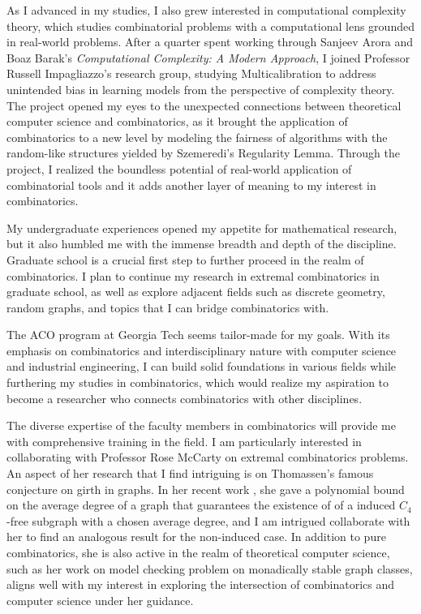\documentclass[12pt]{article}
\begin{document}
As I advanced in my studies, I also grew interested in computational complexity theory, which
studies combinatorial problems with a computational lens grounded in real-world problems. After a
quarter spent working through Sanjeev Arora and Boaz Barak's \textit{Computational Complexity: A
Modern Approach}\cite{arora2009computational}, I joined Professor Russell Impagliazzo's research
group, studying Multicalibration to address unintended bias in learning models from the perspective
of complexity theory. The project opened my eyes to the unexpected connections between theoretical
computer science and combinatorics, as it brought the application of combinatorics to a new level by
modeling the fairness of algorithms with the random-like structures yielded by Szemeredi's
Regularity Lemma. Through the project, I realized the boundless potential of real-world application
of combinatorial tools and it adds another layer of meaning to my interest in combinatorics.

My undergraduate experiences opened my appetite for mathematical research, but it also humbled me
with the immense breadth and depth of the discipline. Graduate school is a crucial first step to
further proceed in the realm of combinatorics. I plan to continue my research in extremal
combinatorics in graduate school, as well as explore adjacent fields such as discrete geometry,
random graphs, and topics that I can bridge combinatorics with.

The ACO program at Georgia Tech seems tailor-made for my goals. With its emphasis on combinatorics
and interdisciplinary nature with computer science and industrial engineering, I can build solid
foundations in various fields while furthering my studies in combinatorics, which would realize my
aspiration to become a researcher who connects combinatorics with other disciplines. 

The diverse expertise of the faculty members in combinatorics will provide me with comprehensive
training in the field. I am particularly interested in collaborating with Professor Rose McCarty on
extremal combinatorics problems. An aspect of her research that I find intriguing is on Thomassen's
famous conjecture on girth in graphs. In her recent work \cite{du2023inducedc4freesubgraphslarge},
she gave a polynomial bound on the average degree of a graph that guarantees the existence of of a
induced $C_4$-free subgraph with a chosen average degree, and I am intrigued collaborate with her to
find an analogous result for the non-induced case. In addition to pure combinatorics, she is also
active in the realm of theoretical computer science, such as her work on model checking problem on
monadically stable graph classes\cite{dreier2023firstordermodelcheckingmonadically}, aligns well
with my interest in exploring the intersection of combinatorics and computer science under her
guidance.
\end{document}
